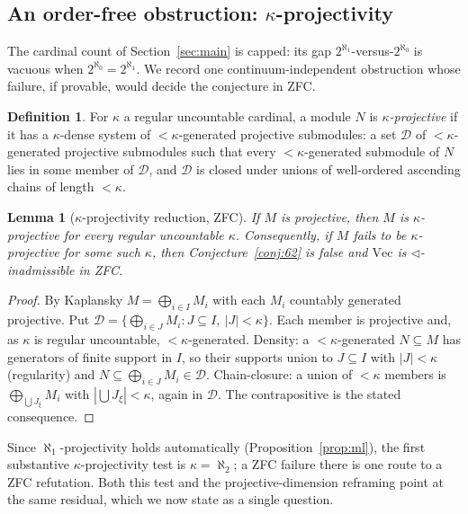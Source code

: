 \documentclass[11pt,reqno]{amsart}
\theoremstyle{plain}
\newtheorem{lemma}[theorem]{Lemma}
\theoremstyle{definition}
\newtheorem{definition}[theorem]{Definition}
\theoremstyle{remark}
\renewcommand{\Vec}{\mathrm{Vec}}
\newcommand{\tri}{\triangleleft}
\begin{document}
\subsection{An order-free obstruction: \texorpdfstring{$\kappa$}{kappa}-projectivity}

The cardinal count of Section~\ref{sec:main} is capped: its gap $2^{\aleph_1}$-versus-$2^{\aleph_0}$ is vacuous when $2^{\aleph_0}=2^{\aleph_1}$. We record one continuum-independent obstruction whose failure, if provable, would decide the conjecture in ZFC.

\begin{definition}
For $\kappa$ a regular uncountable cardinal, a module $N$ is \emph{$\kappa$-projective} if it has a $\kappa$-dense system of $<\kappa$-generated projective submodules: a set $\mathcal D$ of $<\kappa$-generated projective submodules such that every $<\kappa$-generated submodule of $N$ lies in some member of $\mathcal D$, and $\mathcal D$ is closed under unions of well-ordered ascending chains of length $<\kappa$.
\end{definition}

\begin{lemma}[$\kappa$-projectivity reduction, ZFC]\label{lem:kappa}
If $M$ is projective, then $M$ is $\kappa$-projective for every regular uncountable $\kappa$. Consequently, if $M$ fails to be $\kappa$-projective for some such $\kappa$, then Conjecture~\ref{conj:62} is false and $\Vec$ is $\tri$-inadmissible in \textup{ZFC}.
\end{lemma}

\begin{proof}
By Kaplansky $M=\bigoplus_{i\in I}M_i$ with each $M_i$ countably generated projective. Put $\mathcal D=\{\bigoplus_{i\in J}M_i:J\subseteq I,\ |J|<\kappa\}$. Each member is projective and, as $\kappa$ is regular uncountable, $<\kappa$-generated. Density: a $<\kappa$-generated $N\subseteq M$ has generators of finite support in $I$, so their supports union to $J\subseteq I$ with $|J|<\kappa$ (regularity) and $N\subseteq\bigoplus_{i\in J}M_i\in\mathcal D$. Chain-closure: a union of $<\kappa$ members is $\bigoplus_{\bigcup J_\xi}M_i$ with $|\bigcup J_\xi|<\kappa$, again in $\mathcal D$. The contrapositive is the stated consequence.
\end{proof}

Since $\aleph_1$-projectivity holds automatically (Proposition~\ref{prop:ml}), the first substantive $\kappa$-projectivity test is $\kappa=\aleph_2$; a ZFC failure there is one route to a ZFC refutation. Both this test and the projective-dimension reframing point at the same residual, which we now state as a single question.
\end{document}
